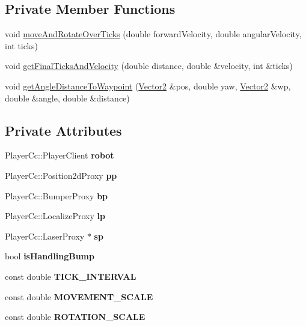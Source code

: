 \subsection*{Private Member Functions}
\begin{DoxyCompactItemize}
\item 
void \hyperlink{classRobot_aa4b3f22bf6f084baaa9a2e2a8b0e491d}{move\+And\+Rotate\+Over\+Ticks} (double forward\+Velocity, double angular\+Velocity, int ticks)
\item 
void \hyperlink{classRobot_a2ff342657f459c4ab2434706d5e9a2d6}{get\+Final\+Ticks\+And\+Velocity} (double distance, double \&velocity, int \&ticks)
\item 
void \hyperlink{classRobot_acc190d23229cf677bd5067eb9258d5ed}{get\+Angle\+Distance\+To\+Waypoint} (\hyperlink{structVector2}{Vector2} \&pos, double yaw, \hyperlink{structVector2}{Vector2} \&wp, double \&angle, double \&distance)
\end{DoxyCompactItemize}
\subsection*{Private Attributes}
\begin{DoxyCompactItemize}
\item 
\mbox{\label{classRobot_ac3903c0fa2e632a3fc62b359ed1f12f2}} 
Player\+Cc\+::\+Player\+Client {\bfseries robot}
\item 
\mbox{\label{classRobot_a1a1e0da135cca4e2b18b6f7d6fa23c37}} 
Player\+Cc\+::\+Position2d\+Proxy {\bfseries pp}
\item 
\mbox{\label{classRobot_a32ed999d2284b95c3596c6f073419332}} 
Player\+Cc\+::\+Bumper\+Proxy {\bfseries bp}
\item 
\mbox{\label{classRobot_afbac60316bed1b1f2d842fd27c0beb5a}} 
Player\+Cc\+::\+Localize\+Proxy {\bfseries lp}
\item 
\mbox{\label{classRobot_af275732b49e679308fb040b5a9c19b58}} 
Player\+Cc\+::\+Laser\+Proxy $\ast$ {\bfseries sp}
\item 
\mbox{\label{classRobot_a9c01fc0ef1c08e887f9665b108a890c8}} 
bool {\bfseries is\+Handling\+Bump}
\item 
\mbox{\label{classRobot_aa22bd6b38ddba98d083cfa26d64d0198}} 
const double {\bfseries T\+I\+C\+K\+\_\+\+I\+N\+T\+E\+R\+V\+AL}
\item 
\mbox{\label{classRobot_ab9aac821c352ae19c69a33e73d8794be}} 
const double {\bfseries M\+O\+V\+E\+M\+E\+N\+T\+\_\+\+S\+C\+A\+LE}
\item 
\mbox{\label{classRobot_a270e244b851508ba5cc9fbc2a871c64e}} 
const double {\bfseries R\+O\+T\+A\+T\+I\+O\+N\+\_\+\+S\+C\+A\+LE}
\end{DoxyCompactItemize}



